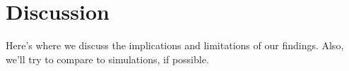 \chapter{Discussion}
\label{c.Discussion}
Here's where we discuss the implications and limitations of our
findings. Also, we'll try to compare to simulations, if possible.
